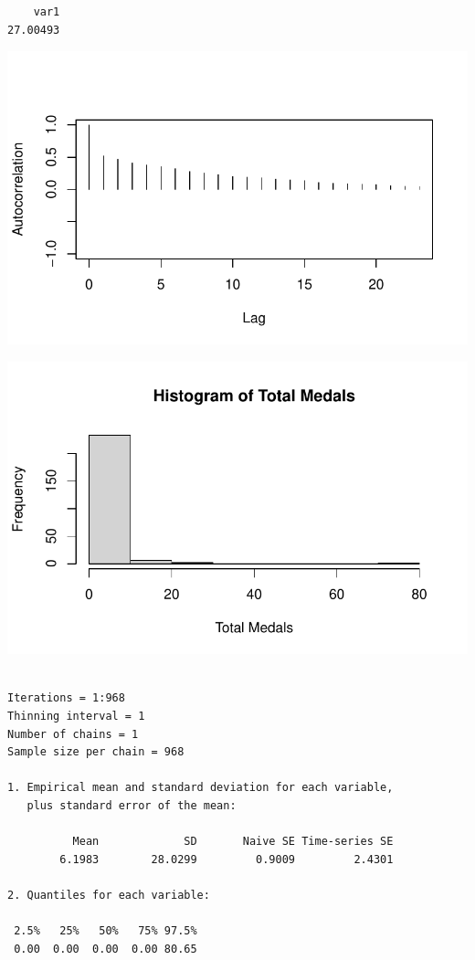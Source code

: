 \documentclass[
  letterpaper,
  DIV=11,
  numbers=noendperiod]{scrartcl}
\begin{document}
\begin{verbatim}
    var1 
27.00493 
\end{verbatim}

\includegraphics{Main_files/figure-pdf/unnamed-chunk-12-2.pdf}

\includegraphics{Main_files/figure-pdf/unnamed-chunk-12-3.pdf}

\begin{verbatim}

Iterations = 1:968
Thinning interval = 1 
Number of chains = 1 
Sample size per chain = 968 

1. Empirical mean and standard deviation for each variable,
   plus standard error of the mean:

          Mean             SD       Naive SE Time-series SE 
        6.1983        28.0299         0.9009         2.4301 

2. Quantiles for each variable:

 2.5%   25%   50%   75% 97.5% 
 0.00  0.00  0.00  0.00 80.65 
\end{verbatim}
\end{document}
